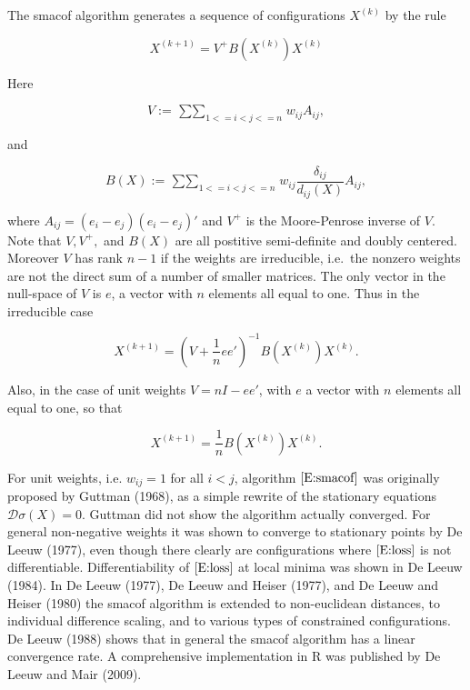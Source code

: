 \documentclass[12pt,]{article}
\begin{document}
The smacof algorithm generates a sequence of configurations \(X^{(k)}\)
by the rule

\begin{equation}\label{E:smacof}
X^{(k+1)}=V^+B(X^{(k)})X^{(k)}
\end{equation}

Here

\begin{equation}\label{E:vmat}
V:=\mathop{\sum\sum}_{1<=i<j<=n}w_{ij}A_{ij},
\end{equation}

and

\begin{equation}\label{E:bmat}
B(X):=\mathop{\sum\sum}_{1<=i<j<=n}w_{ij}\frac{\delta_{ij}}{d_{ij}(X)}A_{ij},
\end{equation}

where \(A_{ij}=(e_i-e_j)(e_i-e_j)'\) and \(V^+\) is the Moore-Penrose
inverse of \(V\). Note that \(V, V^+,\) and \(B(X)\) are all postitive
semi-definite and doubly centered. Moreover \(V\) has rank \(n-1\) if
the weights are irreducible, i.e.~the nonzero weights are not the direct
sum of a number of smaller matrices. The only vector in the null-space
of \(V\) is \(e\), a vector with \(n\) elements all equal to one. Thus
in the irreducible case

\begin{equation}\label{E:inverse}
X^{(k+1)}=(V+\frac{1}{n}ee')^{-1}B(X^{(k)})X^{(k)}.
\end{equation}

Also, in the case of unit weights \(V=nI-ee'\), with \(e\) a vector with
\(n\) elements all equal to one, so that

\begin{equation}\label{E:unit}
X^{(k+1)}=\frac{1}{n}B(X^{(k)})X^{(k)}.
\end{equation}

For unit weights, i.e. \(w_{ij}=1\) for all \(i<j\), algorithm
\(\eqref{E:smacof}\) was originally proposed by Guttman (1968), as a
simple rewrite of the stationary equations \(\mathcal{D}\sigma(X)=0\).
Guttman did not show the algorithm actually converged. For general
non-negative weights it was shown to converge to stationary points by De
Leeuw (1977), even though there clearly are configurations where
\(\eqref{E:loss}\) is not differentiable. Differentiability of
\(\eqref{E:loss}\) at local minima was shown in De Leeuw (1984). In De
Leeuw (1977), De Leeuw and Heiser (1977), and De Leeuw and Heiser (1980)
the smacof algorithm is extended to non-euclidean distances, to
individual difference scaling, and to various types of constrained
configurations. De Leeuw (1988) shows that in general the smacof
algorithm has a linear convergence rate. A comprehensive implementation
in R was published by De Leeuw and Mair (2009).
\end{document}
